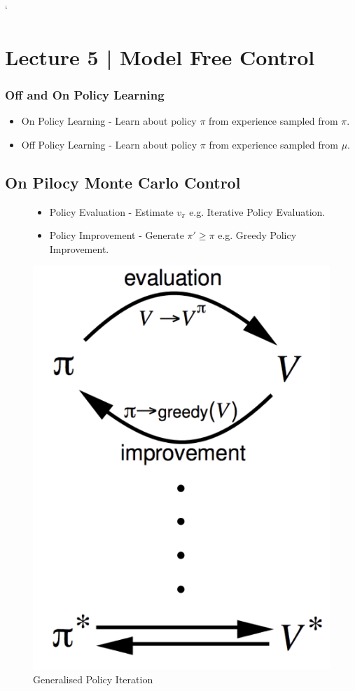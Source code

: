 `\section{Lecture 5 | Model Free Control}

\subsubsection*{Off and On Policy Learning}
\begin{itemize}
  \item On Policy Learning - Learn about policy \(\pi \) from experience sampled from \(\pi \).
  \item Off Policy Learning - Learn about policy \(\pi \) from experience sampled from \(\mu \).
\end{itemize}

\subsection{On Pilocy Monte Carlo Control}

\begin{figure}[H]
    \begin{minipage}{0.5\textwidth}
        \begin{itemize}
            \item Policy Evaluation - Estimate \(v_\pi \) e.g. Iterative Policy Evaluation. 
            \item Policy Improvement - Generate \(\pi' \geq \pi \) e.g. Greedy Policy Improvement.
          \end{itemize}
    \end{minipage}%
    \begin{minipage}{0.5\textwidth}
      \centering
      \includegraphics[height=0.75\textwidth]{figures/gpi.png}
      \caption{Generalised Policy Iteration}
        \label{fig:gpi}
    \end{minipage}
  \end{figure}

